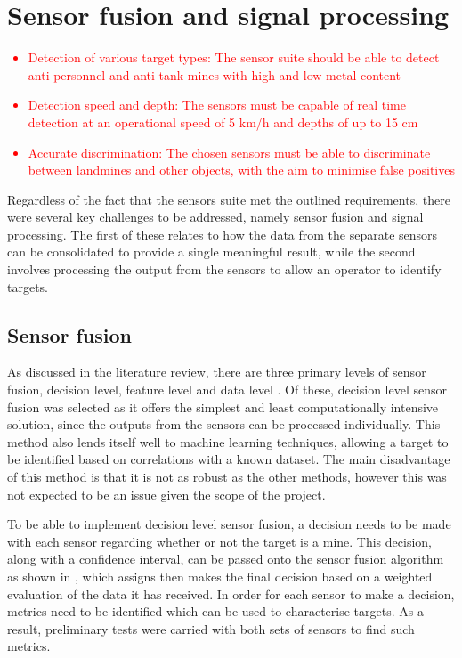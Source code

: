 \documentclass[main.tex]{subfiles}
\begin{document}
\section{Sensor fusion and signal processing}
\textcolor{red}{
\begin{itemize}
\item Detection of various target types: The sensor suite should be able to detect anti-personnel and anti-tank mines with high and low metal content 
\item Detection speed and depth: The sensors must be capable of real time detection at an operational speed of 5 km/h and depths of up to 15 cm
\item Accurate discrimination: The chosen sensors must be able to discriminate between landmines and other objects, with the aim to minimise false positives
\end{itemize}}

Regardless of the fact that the sensors suite met the outlined requirements, there were several key challenges to be addressed, namely sensor fusion and signal processing. The first of these relates to how the data from the separate sensors can be consolidated to provide a single meaningful result, while the second involves processing the output from the sensors to allow an operator to identify targets. 

\subsection{Sensor fusion}
As discussed in the literature review, there are three primary levels of sensor fusion, decision level, feature level and data level \parencite{Yarovoy2009}. Of these, decision level sensor fusion was selected as it offers the simplest and least computationally intensive solution, since the outputs from the sensors can be processed individually. This method also lends itself well to machine learning techniques, allowing a target to be identified based on correlations with a known dataset. The main disadvantage of this method is that it is not as robust as the other methods, however this was not expected to be an issue given the scope of the project. 

To be able to implement decision level sensor fusion, a decision needs to be made with each sensor regarding whether or not the target is a mine. This decision, along with a confidence interval, can be passed onto the sensor fusion algorithm as shown in , which assigns then makes the final decision based on a weighted evaluation of the data it has received. In order for each sensor to make a decision, metrics need to be identified which can be used to characterise targets. As a result, preliminary tests were carried with both sets of sensors to find such metrics.
\end{document}
